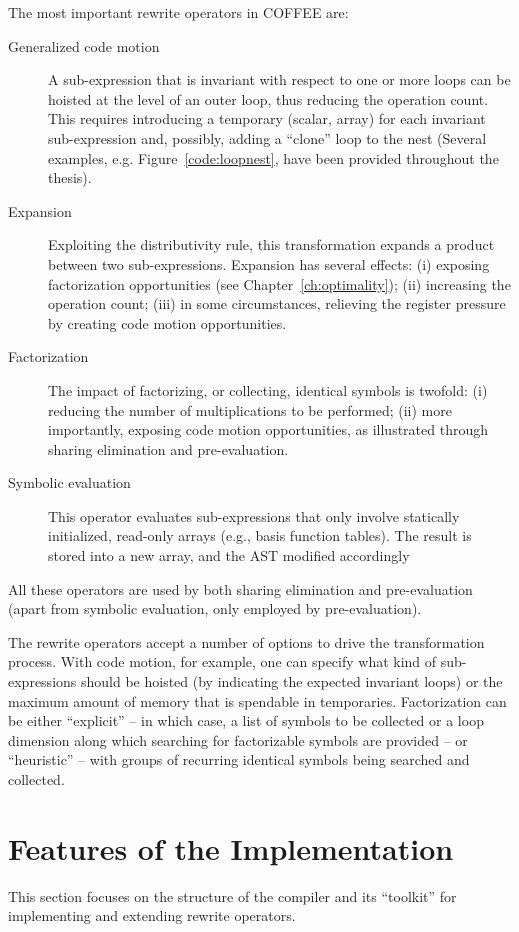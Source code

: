 The most important rewrite operators in COFFEE are:
\begin{description}
\item[Generalized code motion] A sub-expression that is invariant with respect to one or more loops can be hoisted at the level of an outer loop, thus reducing the operation count. This requires introducing a temporary (scalar, array) for each invariant sub-expression and, possibly, adding a ``clone'' loop to the nest (Several examples, e.g. Figure~\ref{code:loopnest}, have been provided throughout the thesis). 
\item[Expansion] Exploiting the distributivity rule, this transformation expands a product between two sub-expressions. Expansion has several effects: (i) exposing factorization opportunities (see Chapter~\ref{ch:optimality}); (ii) increasing the operation count; (iii) in some circumstances, relieving the register pressure by creating code motion opportunities.
\item[Factorization] The impact of factorizing, or collecting, identical symbols is twofold: (i) reducing the number of multiplications to be performed; (ii) more importantly, exposing code motion opportunities, as illustrated through sharing elimination and pre-evaluation.
\item[Symbolic evaluation] This operator evaluates sub-expressions that only involve statically initialized, read-only arrays (e.g., basis function tables). The result is stored into a new array, and the AST modified accordingly
\end{description}
All these operators are used by both sharing elimination and pre-evaluation (apart from symbolic evaluation, only employed by pre-evaluation).

The rewrite operators accept a number of options to drive the transformation process. With code motion, for example, one can specify what kind of sub-expressions should be hoisted (by indicating the expected invariant loops) or the maximum amount of memory that is spendable in temporaries. Factorization can be either ``explicit'' -- in which case, a list of symbols to be collected or a loop dimension along which searching for factorizable symbols are provided -- or ``heuristic'' -- with groups of recurring identical symbols being searched and collected.

\section{Features of the Implementation}
This section focuses on the structure of the compiler and its ``toolkit'' for implementing and extending rewrite operators.


